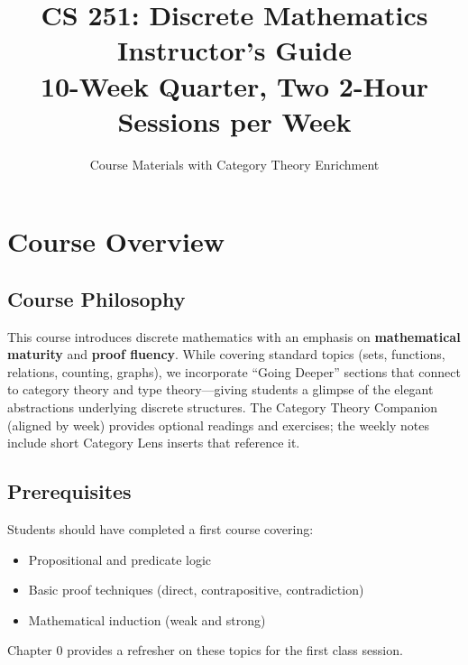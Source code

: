 \documentclass[11pt]{article}
\title{\textbf{CS 251: Discrete Mathematics}\\[0.5em]\Large Instructor's Guide\\[0.3em]\normalsize 10-Week Quarter, Two 2-Hour Sessions per Week}
\author{Course Materials with Category Theory Enrichment}
\date{}
\begin{document}
\maketitle
\thispagestyle{empty}

\tableofcontents
\newpage

\section{Course Overview}

\subsection{Course Philosophy}

This course introduces discrete mathematics with an emphasis on \textbf{mathematical maturity} and \textbf{proof fluency}. While covering standard topics (sets, functions, relations, counting, graphs), we incorporate ``Going Deeper'' sections that connect to category theory and type theory---giving students a glimpse of the elegant abstractions underlying discrete structures.
The Category Theory Companion (aligned by week) provides optional readings and exercises; the weekly notes include short Category Lens inserts that reference it.

\subsection{Prerequisites}
Students should have completed a first course covering:
\begin{itemize}
    \item Propositional and predicate logic
    \item Basic proof techniques (direct, contrapositive, contradiction)
    \item Mathematical induction (weak and strong)
\end{itemize}

Chapter 0 provides a refresher on these topics for the first class session.
\end{document}

